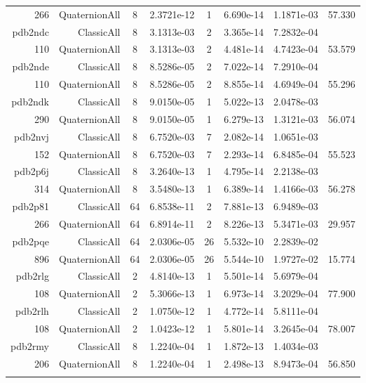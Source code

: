 \begin{xltabular}{\textwidth}{r|rcS[table-format=1.4e+2]cS[table-format=1.3e+2]S[table-format=1.4e+2]S[table-format=-1.3]}
266 & QuaternionAll & 8 & 2.3721e-12 & 1 & 6.690e-14 & 1.1871e-03 & 57.330\\  \addlinespace
pdb2ndc & ClassicAll & 8 & 3.1313e-03 & 2 & 3.365e-14 & 7.2832e-04 & \\
110 & QuaternionAll & 8 & 3.1313e-03 & 2 & 4.481e-14 & 4.7423e-04 & 53.579\\  \addlinespace
pdb2nde & ClassicAll & 8 & 8.5286e-05 & 2 & 7.022e-14 & 7.2910e-04 & \\
110 & QuaternionAll & 8 & 8.5286e-05 & 2 & 8.855e-14 & 4.6949e-04 & 55.296\\  \addlinespace
pdb2ndk & ClassicAll & 8 & 9.0150e-05 & 1 & 5.022e-13 & 2.0478e-03 & \\
290 & QuaternionAll & 8 & 9.0150e-05 & 1 & 6.279e-13 & 1.3121e-03 & 56.074\\  \addlinespace
pdb2nvj & ClassicAll & 8 & 6.7520e-03 & 7 & 2.082e-14 & 1.0651e-03 & \\
152 & QuaternionAll & 8 & 6.7520e-03 & 7 & 2.293e-14 & 6.8485e-04 & 55.523\\  \addlinespace
pdb2p6j & ClassicAll & 8 & 3.2640e-13 & 1 & 4.795e-14 & 2.2138e-03 & \\
314 & QuaternionAll & 8 & 3.5480e-13 & 1 & 6.389e-14 & 1.4166e-03 & 56.278\\  \addlinespace
pdb2p81 & ClassicAll & 64 & 6.8538e-11 & 2 & 7.881e-13 & 6.9489e-03 & \\
266 & QuaternionAll & 64 & 6.8914e-11 & 2 & 8.226e-13 & 5.3471e-03 & 29.957\\  \addlinespace
pdb2pqe & ClassicAll & 64 & 2.0306e-05 & 26 & 5.532e-10 & 2.2839e-02 & \\
896 & QuaternionAll & 64 & 2.0306e-05 & 26 & 5.544e-10 & 1.9727e-02 & 15.774\\  \addlinespace
pdb2rlg & ClassicAll & 2 & 4.8140e-13 & 1 & 5.501e-14 & 5.6979e-04 & \\
108 & QuaternionAll & 2 & 5.3066e-13 & 1 & 6.973e-14 & 3.2029e-04 & 77.900\\  \addlinespace
pdb2rlh & ClassicAll & 2 & 1.0750e-12 & 1 & 4.772e-14 & 5.8111e-04 & \\
108 & QuaternionAll & 2 & 1.0423e-12 & 1 & 5.801e-14 & 3.2645e-04 & 78.007\\  \addlinespace
pdb2rmy & ClassicAll & 8 & 1.2240e-04 & 1 & 1.872e-13 & 1.4034e-03 & \\
206 & QuaternionAll & 8 & 1.2240e-04 & 1 & 2.498e-13 & 8.9473e-04 & 56.850\\  \addlinespace

\end{xltabular}
